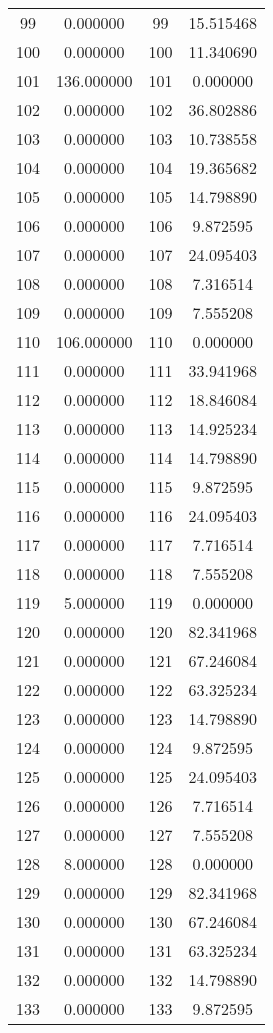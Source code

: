 \documentclass[12pt]{article}
\begin{document}
\begin{longtable}{@{}cccc@{}}
99 & 0.000000 & 99 & 15.515468 \\
100 & 0.000000 & 100 & 11.340690 \\
101 & 136.000000 & 101 & 0.000000 \\
102 & 0.000000 & 102 & 36.802886 \\
103 & 0.000000 & 103 & 10.738558 \\
104 & 0.000000 & 104 & 19.365682 \\
105 & 0.000000 & 105 & 14.798890 \\
106 & 0.000000 & 106 & 9.872595 \\
107 & 0.000000 & 107 & 24.095403 \\
108 & 0.000000 & 108 & 7.316514 \\
109 & 0.000000 & 109 & 7.555208 \\
110 & 106.000000 & 110 & 0.000000 \\
111 & 0.000000 & 111 & 33.941968 \\
112 & 0.000000 & 112 & 18.846084 \\
113 & 0.000000 & 113 & 14.925234 \\
114 & 0.000000 & 114 & 14.798890 \\
115 & 0.000000 & 115 & 9.872595 \\
116 & 0.000000 & 116 & 24.095403 \\
117 & 0.000000 & 117 & 7.716514 \\
118 & 0.000000 & 118 & 7.555208 \\
119 & 5.000000 & 119 & 0.000000 \\
120 & 0.000000 & 120 & 82.341968 \\
121 & 0.000000 & 121 & 67.246084 \\
122 & 0.000000 & 122 & 63.325234 \\
123 & 0.000000 & 123 & 14.798890 \\
124 & 0.000000 & 124 & 9.872595 \\
125 & 0.000000 & 125 & 24.095403 \\
126 & 0.000000 & 126 & 7.716514 \\
127 & 0.000000 & 127 & 7.555208 \\
128 & 8.000000 & 128 & 0.000000 \\
129 & 0.000000 & 129 & 82.341968 \\
130 & 0.000000 & 130 & 67.246084 \\
131 & 0.000000 & 131 & 63.325234 \\
132 & 0.000000 & 132 & 14.798890 \\
133 & 0.000000 & 133 & 9.872595 \\

\end{longtable}
\end{document}
